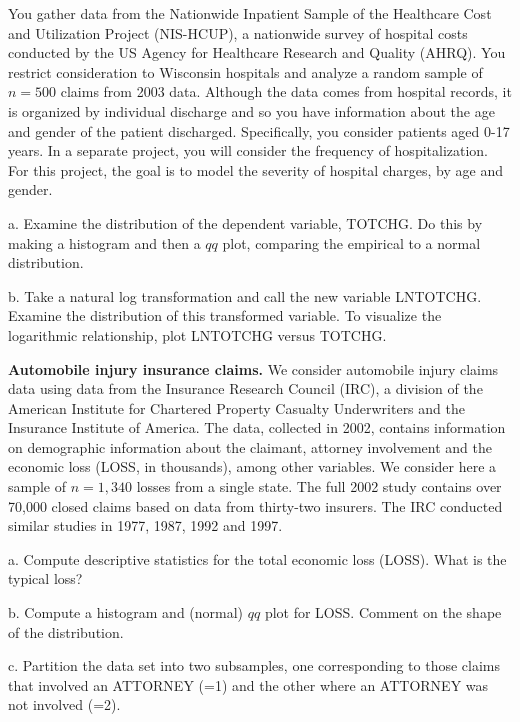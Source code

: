 \begin{exercises}
You gather data from the Nationwide Inpatient Sample of the
Healthcare Cost and Utilization Project (NIS-HCUP), a nationwide
survey of hospital costs conducted by the US Agency for Healthcare
Research and Quality (AHRQ). You restrict consideration to Wisconsin
hospitals and analyze a random sample of $n=500$ claims from 2003
data. Although the data comes from hospital records, it is organized
by individual discharge and so you have information about the age
and gender of the patient discharged. Specifically, you consider
patients aged 0-17 years. In a separate project, you will consider
the frequency of hospitalization. For this project, the goal is to
model the severity of hospital charges, by age and gender.

a. Examine the distribution of the dependent variable, TOTCHG. Do
this by making a histogram and then a $qq$ plot, comparing the
empirical to a normal distribution.

b. Take a natural log transformation and call the new variable
LNTOTCHG. Examine the distribution of this transformed variable. To
visualize the logarithmic relationship, plot LNTOTCHG versus TOTCHG.

\newpage


\item \textbf{Automobile injury insurance claims.}\label{Ex:IRC}
We consider automobile injury claims data using data from the
Insurance Research Council (IRC), a division of the American
Institute for Chartered Property Casualty Underwriters and the
Insurance Institute of America. The data, collected in 2002,
contains information on demographic information about the claimant,
attorney involvement and the economic loss (LOSS, in thousands),
among other variables. We consider here a sample of $n=1,340$ losses
from a single state. The full 2002 study contains over 70,000 closed
claims based on data from thirty-two insurers. The IRC conducted
similar studies in 1977, 1987, 1992 and 1997.

a. Compute descriptive statistics for the total economic loss
(LOSS). What is the typical loss?

b. Compute a histogram and (normal) $qq$ plot for LOSS. Comment on
the shape of the distribution.

c. Partition the data set into two subsamples, one corresponding to
those claims that involved an ATTORNEY (=1) and the other where an
ATTORNEY was not involved (=2).


\end{exercises}
